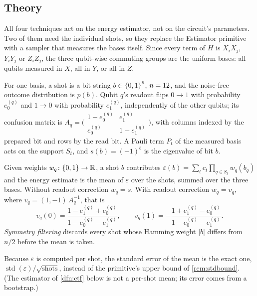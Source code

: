 \subsection{Theory}

All four techniques act on the energy estimator, not on the circuit's parameters. Two of them
need the individual shots, so they replace the Estimator primitive with a sampler that measures
the \VMeasGroups{} bases itself. Since every term of $H$ is $X_iX_j$, $Y_iY_j$ or $Z_iZ_j$, the
three qubit-wise commuting groups are the uniform bases: all qubits measured in $X$, all in $Y$,
or all in $Z$.

\begin{ntn}
  For one basis, a shot is a bit string $b\in\{0,1\}^{n}$, $n=12$, and the noise-free
  outcome distribution is $p(b)$. Qubit $q$'s readout flips $0\to1$ with probability $e_0^{(q)}$
  and $1\to0$ with probability $e_1^{(q)}$, independently of the other qubits; its confusion
  matrix is
  $A_q=\bigl(\begin{smallmatrix}1-e_0^{(q)} & e_1^{(q)}\\ e_0^{(q)} & 1-e_1^{(q)}\end{smallmatrix}\bigr)$,
  with columns indexed by the prepared bit and rows by the read bit. A Pauli term $P_t$ of the
  measured basis acts on the support $S_t$, and $s(b)=(-1)^{b}$ is the eigenvalue of bit $b$.
\end{ntn}

\begin{dfn}\label{dfn:counts}
  Given weights $w_q\colon\{0,1\}\to\mathbb{R}$, a shot $b$ contributes
  $\varepsilon(b)=\sum_t c_t\prod_{q\in S_t}w_q(b_q)$ and the energy estimate is the mean of
  $\varepsilon$ over the shots, summed over the three bases. Without readout correction
  $w_q=s$. With readout correction $w_q=v_q$, where $v_q=(1,-1)\,A_q^{-1}$, that is
  \[
    v_q(0)=\frac{1-e_1^{(q)}+e_0^{(q)}}{1-e_0^{(q)}-e_1^{(q)}},\qquad
    v_q(1)=-\frac{1+e_1^{(q)}-e_0^{(q)}}{1-e_0^{(q)}-e_1^{(q)}} .
  \]
  \emph{Symmetry filtering} discards every shot whose Hamming weight $|b|$ differs from $n/2$
  before the mean is taken.
\end{dfn}

Because $\varepsilon$ is computed per shot, the standard error of the mean is the exact one,
$\operatorname{std}(\varepsilon)/\sqrt{\text{shots}}$, instead of the primitive's upper bound
of \cref{rem:stdbound}. (The estimator of \cref{dfn:ctf} below is not a per-shot mean; its
error comes from a bootstrap.)


